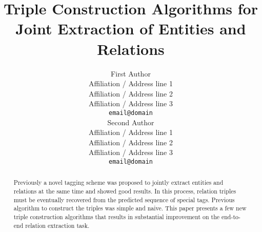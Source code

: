 \documentclass[11pt,a4paper]{article}
\title{Triple Construction Algorithms for Joint Extraction of Entities and Relations}
\author{First Author \\
  Affiliation / Address line 1 \\
  Affiliation / Address line 2 \\
  Affiliation / Address line 3 \\
  {\tt email@domain} \\\And
  Second Author \\
  Affiliation / Address line 1 \\
  Affiliation / Address line 2 \\
  Affiliation / Address line 3 \\
  {\tt email@domain} \\}
\date{}
\theoremstyle{definition}
\begin{document}
\maketitle
\begin{abstract}
Previously a novel tagging scheme was proposed to jointly
extract entities and relations at the same time and showed
good results. In this process, relation triples must be
eventually recovered from the predicted sequence of special tags.
Previous algorithm to construct the triples was simple and naive.
This paper presents a few new triple construction algorithms
that results in substantial improvement on the end-to-end
relation extraction task.
\end{abstract}



%
%
%


%





\end{document}
